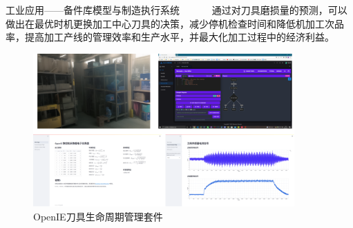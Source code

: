 \begin{frame}{工业应用——备件库模型与制造执行系统}
% 
\ \ \ \ \ \ 通过对刀具磨损量的预测，可以做出在最优时机更换加工中心刀具的决策，减少停机检查时间和降低机加工次品率，提高加工产线的管理效率和生产水平，并最大化加工过程中的经济利益。
\begin{figure}[htp]
    \centering
    \includegraphics[width=10cm]{工业应用/openiecom.png}
    \caption{OpenIE刀具生命周期管理套件}
\end{figure}
% 
\end{frame}